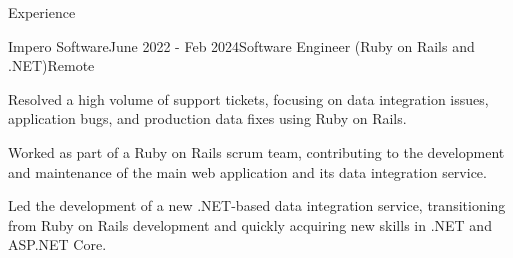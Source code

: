 \documentclass{resume}
\begin{document}
  \begin{rSection}{Experience}

  \begin{rSubsection}{Impero Software}{June 2022 - Feb 2024}{Software Engineer (Ruby on Rails and .NET)}{Remote}
        \item Resolved a high volume of support tickets, focusing on data integration issues, application bugs, and production data fixes using Ruby on Rails.
        \item Worked as part of a Ruby on Rails scrum team, contributing to the development and maintenance of the main web application and its data integration service.
        \item Led the development of a new .NET-based data integration service, transitioning from Ruby on Rails development and quickly acquiring new skills in .NET and ASP.NET Core.



  


\end{rSubsection}
\end{rSection}
\end{document}
